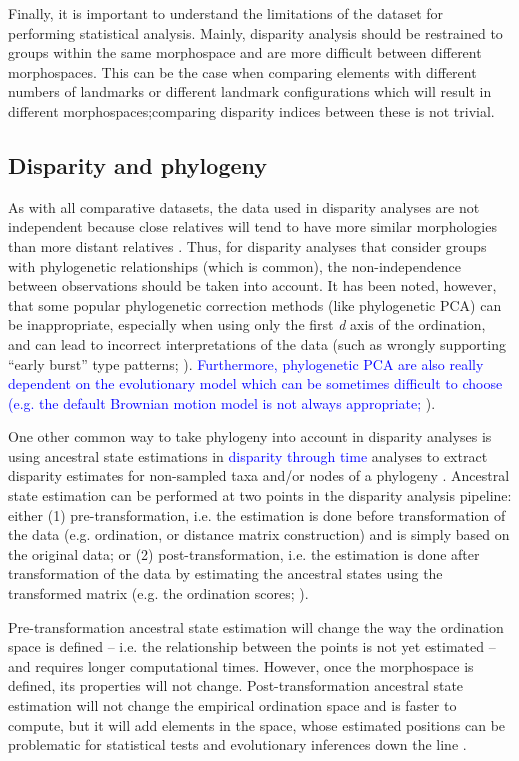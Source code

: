 \documentclass[12pt,letterpaper]{article}
\begin{document}
Finally, it is important to understand the limitations of the dataset for performing statistical analysis.
Mainly, disparity analysis should be restrained to groups within the same morphospace and are more difficult between different morphospaces.
This can be the case when comparing elements with different numbers of landmarks or different landmark configurations which will result in different morphospaces;comparing disparity indices between these is not trivial.

\subsection{Disparity and phylogeny} \label{section:phylo}

As with all comparative datasets, the data used in disparity analyses are not independent because close relatives will tend to have more similar morphologies than more distant relatives \citep{Harvey1998}.
Thus, for disparity analyses that consider groups with phylogenetic relationships (which is common), the non-independence between observations should be taken into account.
It has been noted, however, that some popular phylogenetic correction methods (like phylogenetic PCA) can be inappropriate, especially when using only the first \textit{d} axis of the ordination, and can lead to incorrect interpretations of the data (such as wrongly supporting ``early burst'' type patterns; \citealt{Uyeda2015}).
\textcolor{blue}{Furthermore, phylogenetic PCA are also really dependent on the evolutionary model which can be sometimes difficult to choose (e.g. the default Brownian motion model is not always appropriate;} \citealt{blomberg2020}).

One other common way to take phylogeny into account in disparity analyses is using ancestral state estimations in \textcolor{blue}{disparity through time} analyses to extract disparity estimates for non-sampled taxa and/or nodes of a phylogeny \citep{brusatte2011phylogenetic,Guillerme2018}.
Ancestral state estimation can be performed at two points in the disparity analysis pipeline: either (1) pre-transformation, i.e. the estimation is done before transformation of the data (e.g. ordination, or distance matrix construction) and is simply based on the original data; or (2) post-transformation, i.e. the estimation is done after transformation of the data by estimating the ancestral states using the transformed matrix (e.g. the ordination scores; \citealt{lloyd2018}).

Pre-transformation ancestral state estimation will change the way the ordination space is defined -- i.e.
the relationship between the points is not yet estimated -- and requires longer computational times.
However, once the morphospace is defined, its properties will not change.
Post-transformation ancestral state estimation will not change the empirical ordination space and is faster to compute, but it will add elements in the space, whose estimated positions can be problematic for statistical tests and evolutionary inferences down the line \citep{lloyd2018}.
\end{document}
